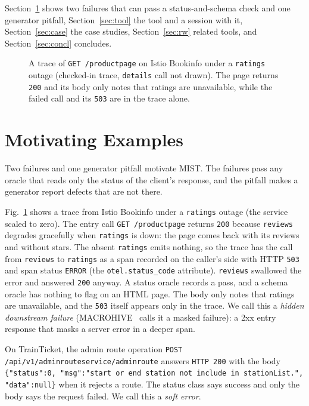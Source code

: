 \documentclass[10pt,conference]{IEEEtran}
\begin{document}
Section~\ref{sec:motiv} shows two failures that can pass a status-and-schema check and one generator pitfall, Section~\ref{sec:tool} the tool and a session with it, Section~\ref{sec:case} the case studies, Section~\ref{sec:rw} related tools, and Section~\ref{sec:concl} concludes.

\begin{figure}[t]
  \centering
  \resizebox{\textwidth}{!}{}
  \caption{A trace of \texttt{GET /productpage} on Istio Bookinfo under a \texttt{ratings} outage (checked-in trace, \texttt{details} call not drawn). The page returns \texttt{200} and its body only notes that ratings are unavailable, while the failed call and its \texttt{503} are in the trace alone.}
  \label{fig:trace}
\end{figure}

\section{Motivating Examples}\label{sec:motiv}

Two failures and one generator pitfall motivate MIST. The failures pass any oracle that reads only the status of the client's response, and the pitfall makes a generator report defects that are not there.

Fig.~\ref{fig:trace} shows a trace from Istio Bookinfo under a \texttt{ratings} outage (the service scaled to zero). The entry call \texttt{GET /productpage} returns \texttt{200} because \texttt{reviews} degrades gracefully when \texttt{ratings} is down: the page comes back with its reviews and without stars. The absent \texttt{ratings} emits nothing, so the trace has the call from \texttt{reviews} to \texttt{ratings} as a span recorded on the caller's side with HTTP \texttt{503} and span status \texttt{ERROR} (the \texttt{otel.status\_code} attribute). \texttt{reviews} swallowed the error and answered \texttt{200} anyway. A status oracle records a pass, and a schema oracle has nothing to flag on an HTML page. The body only notes that ratings are unavailable, and the \texttt{503} itself appears only in the trace. We call this a \emph{hidden downstream failure} (MACROHIVE~\cite{Giamattei2022MACROHIVE} calls it a masked failure): a 2xx entry response that masks a server error in a deeper span.

On TrainTicket, the admin route operation \texttt{POST /api/v1/\allowbreak adminrouteservice/\allowbreak adminroute} answers \texttt{HTTP 200} with the body \texttt{\{"status":0,\allowbreak{} "msg":"start or end station not include in stationList.",\allowbreak{} "data":null\}} when it rejects a route. The status class says success and only the body says the request failed. We call this a \emph{soft error}.
\end{document}
